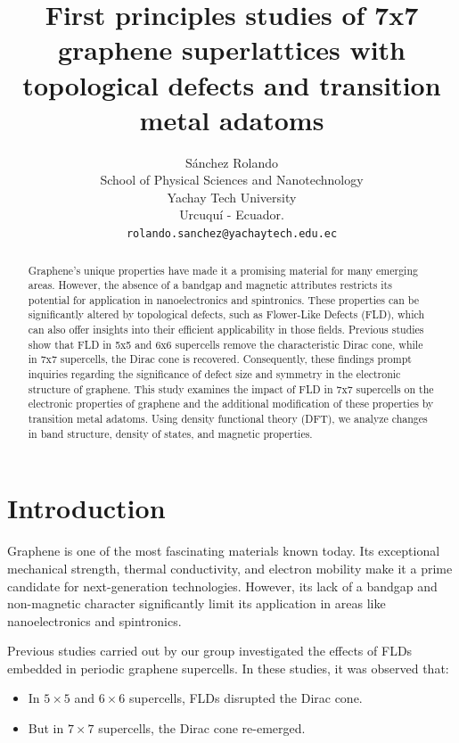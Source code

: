 \documentclass{article}
\title{First principles studies of 7x7 graphene superlattices with topological defects and transition metal adatoms} %
\author{
 Sánchez Rolando \\
 School of Physical Sciences and Nanotechnology\\
 Yachay Tech University\\
 Urcuquí - Ecuador. \\
 \texttt{rolando.sanchez@yachaytech.edu.ec} \\
}
\begin{document}
\maketitle
\begin{abstract}
Graphene's unique properties have made it a promising material for many emerging areas. However, the absence of a bandgap and magnetic attributes restricts its potential for application in nanoelectronics and spintronics. These properties can be significantly altered by topological defects, such as Flower-Like Defects (FLD), which can also offer insights into their efficient applicability in those fields. Previous studies show that FLD in 5x5 and 6x6 supercells remove the characteristic Dirac cone, while in 7x7 supercells, the Dirac cone is recovered. Consequently, these findings prompt inquiries regarding the significance of defect size and symmetry in the electronic structure of graphene.
This study examines the impact of FLD in 7x7 supercells on the electronic properties of graphene and the additional modification of these properties by transition metal adatoms. Using density functional theory (DFT), we analyze changes in band structure, density of states, and magnetic properties. 
\end{abstract}


\section{Introduction}
Graphene is one of the most fascinating materials known today. Its exceptional mechanical strength, thermal conductivity, and electron mobility make it a prime candidate for next-generation technologies. However, its lack of a bandgap and non-magnetic character significantly limit its application in areas like nanoelectronics and spintronics.

Previous studies carried out by our group investigated the effects of FLDs embedded in periodic graphene supercells. In these studies, it was observed that:
\begin{itemize}
    \item In $5\times 5$ and $6 \times 6$ supercells, FLDs disrupted the Dirac cone.
    \item But in $7\times7$ supercells, the Dirac cone re-emerged.
\end{itemize}
\end{document}
